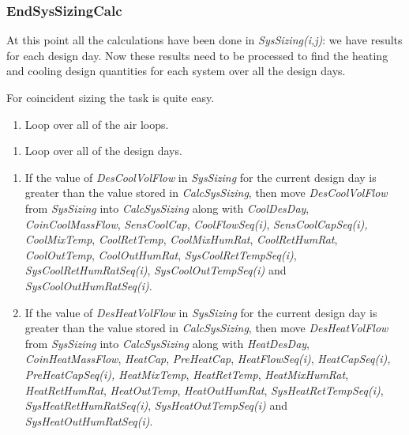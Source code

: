 \subsubsection{EndSysSizingCalc}\label{endsyssizingcalc}

At this point all the calculations have been done in \emph{SysSizing(i,j)}: we have results for each design day. Now these results need to be processed to find the heating and cooling design quantities for each system over all the design days.

For coincident sizing the task is quite easy.

\begin{enumerate}
\def\labelenumi{(\arabic{enumi})}
\tightlist
\item
  Loop over all of the air loops.
\end{enumerate}

\begin{enumerate}
\def\labelenumi{(\alph{enumi})}
\item Loop over all of the design days.
\end{enumerate}

\begin{enumerate}
\def\labelenumi{(\roman{enumi})}
\item If the value of \emph{DesCoolVolFlow} in \emph{SysSizing} for the current design day is greater than the value stored in \emph{CalcSysSizing}, then move \emph{DesCoolVolFlow} from \emph{SysSizing} into \emph{CalcSysSizing} along with \emph{CoolDesDay}, \emph{CoinCoolMassFlow}, \emph{SensCoolCap}, \emph{CoolFlowSeq(i)}, \emph{SensCoolCapSeq(i),} \emph{CoolMixTemp}, \emph{CoolRetTemp}, \emph{CoolMixHumRat}, \emph{CoolRetHumRat}, \emph{CoolOutTemp}, \emph{CoolOutHumRat}, \emph{SysCoolRetTempSeq(i)}, \emph{SysCoolRetHumRatSeq(i)}, \emph{SysCoolOutTempSeq(i)} and \emph{SysCoolOutHumRatSeq(i)}.

\item If the value of \emph{DesHeatVolFlow} in \emph{SysSizing} for the current design day is greater than the value stored in \emph{CalcSysSizing}, then move \emph{DesHeatVolFlow} from \emph{SysSizing} into \emph{CalcSysSizing} along with \emph{HeatDesDay}, \emph{CoinHeatMassFlow}, \emph{HeatCap}, \emph{PreHeatCap}, \emph{HeatFlowSeq(i)}, \emph{HeatCapSeq(i),} \emph{PreHeatCapSeq(i), HeatMixTemp}, \emph{HeatRetTemp}, \emph{HeatMixHumRat}, \emph{HeatRetHumRat}, \emph{HeatOutTemp}, \emph{HeatOutHumRat}, \emph{SysHeatRetTempSeq(i)}, \emph{SysHeatRetHumRatSeq(i)}, \emph{SysHeatOutTempSeq(i)} and \emph{SysHeatOutHumRatSeq(i)}.

\end{enumerate}

